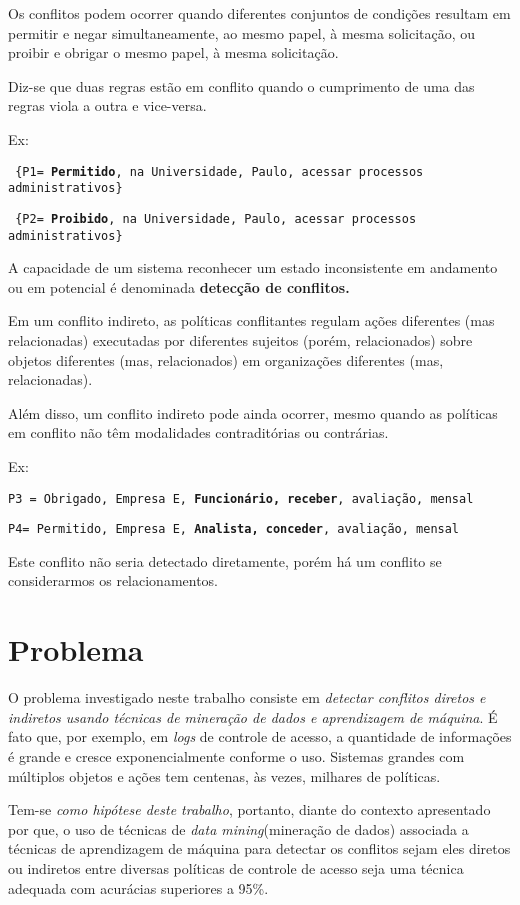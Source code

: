 Os conflitos podem ocorrer quando diferentes conjuntos de condições resultam em permitir e negar simultaneamente, ao mesmo papel, à mesma solicitação, ou proibir e obrigar o mesmo papel, à mesma solicitação.

Diz-se que duas regras estão em conflito quando o cumprimento de uma das regras viola a outra e vice-versa. 

Ex:

{\scriptsize \texttt{ \{P1= {\textbf{Permitido}, na Universidade, Paulo, acessar processos administrativos\} }}}

{\scriptsize \texttt{ \{P2= {\textbf{Proibido}, na Universidade, Paulo, acessar processos administrativos\} }}}

A capacidade de um sistema reconhecer um estado inconsistente em andamento ou em potencial é denominada \textbf{detecção de conflitos.}

Em um conflito indireto, as políticas conflitantes regulam ações diferentes (mas relacionadas) executadas por diferentes sujeitos (porém, relacionados) sobre objetos diferentes (mas, relacionados) em organizações diferentes (mas, relacionadas). 

Além disso, um conflito indireto pode ainda ocorrer, mesmo quando as políticas em conflito não têm modalidades contraditórias ou contrárias.

Ex:

{\scriptsize \texttt{P3 = {Obrigado, Empresa E, \textbf{Funcionário, receber}, avaliação, mensal}}}

{\scriptsize \texttt{P4= {Permitido, Empresa E, \textbf{Analista, conceder}, avaliação, mensal}}}

Este conflito não seria detectado diretamente, porém há um conflito se considerarmos os relacionamentos.

\section{Problema}\label{problema}
O problema investigado neste trabalho consiste em \textit{detectar conflitos diretos e indiretos usando técnicas de mineração de dados e aprendizagem de máquina}. É fato que, por exemplo, em \textit{logs} de controle de acesso, a quantidade de informações é grande e cresce exponencialmente conforme o uso. Sistemas grandes com múltiplos objetos e ações tem centenas, às vezes, milhares de políticas.\cite{fugini_information_2004}

Tem-se \textit{como hipótese deste trabalho}, portanto, diante do contexto apresentado por \cite{fugini_information_2004} que, o uso de técnicas de \textit{data mining}(mineração de dados) associada a técnicas de aprendizagem de máquina para detectar os conflitos sejam eles diretos ou indiretos entre diversas políticas de controle de acesso seja uma técnica adequada com acurácias superiores a 95\%.

